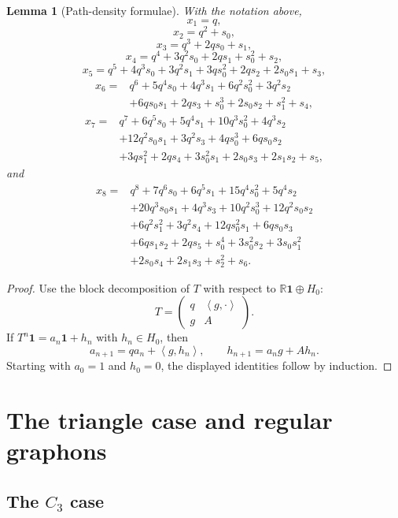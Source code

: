 \documentclass[11pt]{article}
\newtheorem{lemma}[theorem]{Lemma}
\newcommand{\one}{\mathbf 1}
\newcommand{\ip}[2]{\left\langle #1,#2\right\rangle}
\begin{document}
\begin{lemma}[Path-density formulae]\label{lem:path-formulae}
With the notation above,
\[
        x_1=q,
\]
\[
        x_2=q^2+s_0,
\]
\[
        x_3=q^3+2qs_0+s_1,
\]
\[
        x_4=q^4+3q^2s_0+2qs_1+s_0^2+s_2,
\]
\[
        x_5=q^5+4q^3s_0+3q^2s_1+3qs_0^2+2qs_2+2s_0s_1+s_3,
\]
\[
\begin{aligned}
        x_6={}&q^6+5q^4s_0+4q^3s_1+6q^2s_0^2+3q^2s_2\\
        &+6qs_0s_1+2qs_3+s_0^3+2s_0s_2+s_1^2+s_4,
\end{aligned}
\]
\[
\begin{aligned}
        x_7={}&q^7+6q^5s_0+5q^4s_1+10q^3s_0^2+4q^3s_2\\
        &+12q^2s_0s_1+3q^2s_3+4qs_0^3+6qs_0s_2\\
        &+3qs_1^2+2qs_4+3s_0^2s_1+2s_0s_3+2s_1s_2+s_5,
\end{aligned}
\]
and
\[
\begin{aligned}
        x_8={}&q^8+7q^6s_0+6q^5s_1+15q^4s_0^2+5q^4s_2\\
        &+20q^3s_0s_1+4q^3s_3+10q^2s_0^3+12q^2s_0s_2\\
        &+6q^2s_1^2+3q^2s_4+12qs_0^2s_1+6qs_0s_3\\
        &+6qs_1s_2+2qs_5+s_0^4+3s_0^2s_2+3s_0s_1^2\\
        &+2s_0s_4+2s_1s_3+s_2^2+s_6.
\end{aligned}
\]
\end{lemma}

\begin{proof}
Use the block decomposition of $T$ with respect to $\mathbb R\one\oplus H_0$:
\[
        T=\begin{pmatrix}
            q & \ip{g}{\cdot}\\
            g & A
        \end{pmatrix}.
\]
If $T^n\one=a_n\one+h_n$ with $h_n\in H_0$, then
\[
        a_{n+1}=qa_n+\ip{g}{h_n},
        \qquad
        h_{n+1}=a_ng+Ah_n.
\]
Starting with $a_0=1$ and $h_0=0$, the displayed identities follow by induction.
\end{proof}

\section{The triangle case and regular graphons}\label{sec:C3reg}

\subsection{The $C_3$ case}
\end{document}
